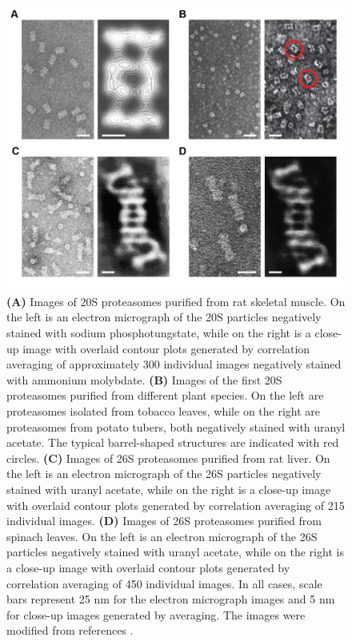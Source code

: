 \begin{figure}[p]
	\centering
	\includegraphics[width=\columnwidth]{intro/emstructure.png}
	{\textbf{(A)} Images of 20S proteasomes purified from rat skeletal muscle. On the left is an electron micrograph of the 20S particles negatively stained with sodium phosphotungstate, while on the right is a close-up image with overlaid contour plots generated by correlation averaging of approximately 300 individual images negatively stained with ammonium molybdate. \textbf{(B)} Images of the first 20S proteasomes purified from different plant species. On the left are proteasomes isolated from tobacco leaves, while on the right are proteasomes from potato tubers, both negatively stained with uranyl acetate. The typical barrel-shaped structures are indicated with red circles. \textbf{(C)} Images of 26S proteasomes purified from rat liver. On the left is an electron micrograph of the 26S particles negatively stained with uranyl acetate, while on the right is a close-up image with overlaid contour plots generated by correlation averaging of 215 individual images. \textbf{(D)} Images of 26S proteasomes purified from spinach leaves.  On the left is an electron micrograph of the 26S particles negatively stained with uranyl acetate, while on the right is a close-up image with overlaid contour plots generated by correlation averaging of 450 individual images. In all cases, scale bars represent 25 nm for the electron micrograph images and 5 nm for close-up images generated by averaging. The images were modified from references \citep{baumeister88, fujinami94, kremp86, schliephacke91, yoshimura93}.}
	\label{fig:emstructure}
\end{figure}

